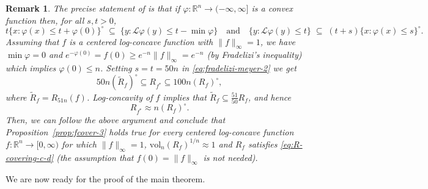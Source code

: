 \documentclass[11pt,leqno]{article}
\newtheorem{remark}[theorem]{Remark}
\theoremstyle{definition}
\theoremstyle{remark}
\numberwithin{equation}{section}
\newcommand{\vol}{\mathrm{vol}}
\newcommand{\ls}{\leqslant}
\newcommand{\gr}{\geqslant}
\begin{document}
\begin{remark}\label{rem:fradelizi-meyer}\rm The precise statement of \cite[Lemma~8]{Fradelizi-Meyer-2008} is that if $\varphi:\mathbb{R}^n\to (-\infty,\infty]$
is a convex function then, for all $s,t>0$,
\begin{equation}\label{eq:fradelizi-meyer-2}
t\{x:\varphi(x)\ls t+\varphi(0)\}^{\circ}\;\subseteq\;\{y:\mathcal{L}\varphi(y)\ls t-\min\varphi\}\quad
\text{and}\quad 
\{y:\mathcal{L}\varphi(y)\ls t\}\;\subseteq\;(t+s)\{x:\varphi(x)\ls s\}^{\circ}.
\end{equation}
Assuming that $f$ is a centered log-concave function with $\|f\|_{\infty}=1$, we have $\min\varphi =0$ and $e^{-\varphi(0)}=f(0)\gr e^{-n}\|f\|_{\infty}=e^{-n}$
(by Fradelizi's inequality) which implies $\varphi(0)\ls n$. Setting $s=t=50n$ in \eqref{eq:fradelizi-meyer-2} we get
$$50n(\tilde{R}_f)^{\circ}\subseteq R_{f^{\ast}}\subseteq 100n(R_f)^{\circ},$$
where $\tilde{R}_f=R_{51n}(f)$. Log-concavity of $f$ implies that $\tilde{R}_f\subseteq \frac{51}{50}R_f$, and hence 
$$R_{f^{\ast}}\approx n(R_f)^{\circ}.$$
Then, we can follow the above argument and conclude that Proposition~\ref{prop:fcover-3} holds true for every
centered log-concave function $f:\mathbb{R}^n\to[0,\infty)$ for which $\|f\|_{\infty}=1$,  $\vol_n(R_f)^{1/n}\approx 1$ and $R_f$ satisfies 
\eqref{eq:R-covering-c-d} (the assumption that $f(0)=\|f\|_{\infty}$ is not needed).
\end{remark}

We are now ready for the proof of the main theorem.
\end{document}
